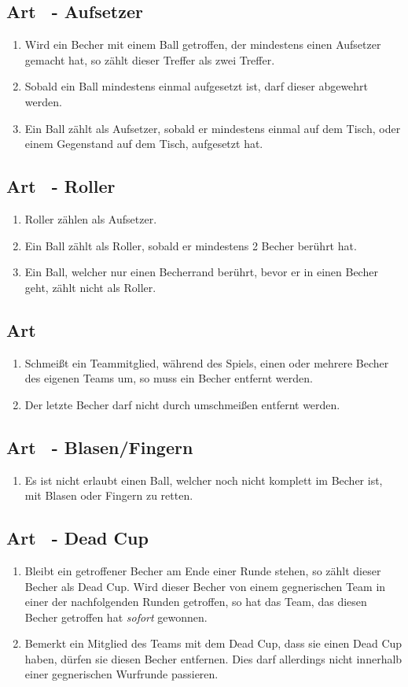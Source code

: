\documentclass[a4paper,11pt]{scrartcl}
\newcommand{\enum}[1]{\begin{enumerate}[label=(\arabic*)]#1\end{enumerate}}
\newcommand{\art}[2]{\subsection*{#1} \enum{#2}}
\newcommand{\quot}[1]{\glqq #1\grqq}
\newcounter{art}
\begin{document}
    \art{Art \theart\ - Aufsetzer}{
        \item
            Wird ein Becher mit einem Ball getroffen, der mindestens einen Aufsetzer gemacht hat, so zählt dieser Treffer als zwei Treffer.
        \item
            Sobald ein Ball mindestens einmal aufgesetzt ist, darf dieser abgewehrt werden.
        \item
            Ein Ball zählt als Aufsetzer, sobald er mindestens einmal auf dem Tisch, oder einem Gegenstand auf dem Tisch, aufgesetzt hat.
    }

    \art{Art \theart\ - Roller}{
        \item
            Roller zählen als Aufsetzer.
        \item
            Ein Ball zählt als Roller, sobald er mindestens 2 Becher berührt hat.
        \item
            Ein Ball, welcher nur einen Becherrand berührt, bevor er in einen Becher geht, zählt nicht als Roller.
    }

    \art{Art \theart}{
        \item
            Schmeißt ein Teammitglied, während des Spiels, einen oder mehrere Becher des eigenen Teams um, so muss ein Becher entfernt werden.
        \item
            Der letzte Becher darf nicht durch umschmeißen entfernt werden.
    }

    \art{Art \theart\ - \quot{Blasen/Fingern}}{
        \item
            Es ist nicht erlaubt einen Ball, welcher noch nicht komplett im Becher ist, mit \quot{Blasen} oder \quot{Fingern} zu retten.
    }

    \art{Art \theart\ - \quot{Dead Cup}}{
        \item
            Bleibt ein getroffener Becher am Ende einer Runde stehen, so zählt dieser Becher als \quot{Dead Cup}. Wird dieser Becher von einem gegnerischen Team in einer der nachfolgenden Runden getroffen, so hat das Team, das diesen Becher getroffen hat \emph{sofort} gewonnen.
        \item
            Bemerkt ein Mitglied des Teams mit dem \quot{Dead Cup}, dass sie einen \quot{Dead Cup} haben, dürfen sie diesen Becher entfernen. Dies darf allerdings nicht innerhalb einer gegnerischen Wurfrunde passieren.
    }
\end{document}

